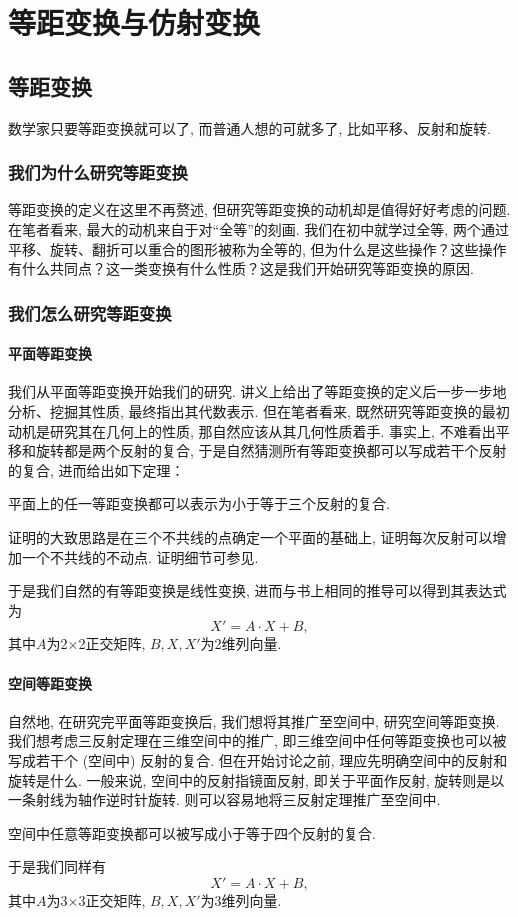 \documentclass[./main.tex]{subfiles}
\begin{document}
\chapter{等距变换与仿射变换}
\section{等距变换}\label{4.1}
数学家只要等距变换就可以了, 而普通人想的可就多了, 比如平移、反射和旋转. 
\subsection{我们为什么研究等距变换}
等距变换的定义在这里不再赘述, 但研究等距变换的动机却是值得好好考虑的问题. 在笔者看来, 最大的动机来自于对``全等''的刻画. 我们在初中就学过全等, 两个通过平移、旋转、翻折可以重合的图形被称为全等的, 但为什么是这些操作？这些操作有什么共同点？这一类变换有什么性质？这是我们开始研究等距变换的原因. 
\subsection{我们怎么研究等距变换}
\subsubsection{平面等距变换}
我们从平面等距变换开始我们的研究. 讲义上给出了等距变换的定义后一步一步地分析、挖掘其性质, 最终指出其代数表示. 但在笔者看来, 既然研究等距变换的最初动机是研究其在几何上的性质, 那自然应该从其几何性质着手. 事实上, 不难看出平移和旋转都是两个反射的复合, 于是自然猜测所有等距变换都可以写成若干个反射的复合, 进而给出如下定理：
\begin{theorem}[三反射定理]
    平面上的任一等距变换都可以表示为小于等于三个反射的复合. 
\end{theorem}
证明的大致思路是在三个不共线的点确定一个平面的基础上, 证明每次反射可以增加一个不共线的不动点. 证明细节可参见\cite{gos}.

于是我们自然的有等距变换是线性变换, 进而与书上相同的推导可以得到其表达式为
\[
X'=A\cdot X+B,
\]
其中$A$为2×2正交矩阵, $B,X,X'$为2维列向量. 
\subsubsection{空间等距变换}
自然地, 在研究完平面等距变换后, 我们想将其推广至空间中, 研究空间等距变换. 我们想考虑三反射定理在三维空间中的推广, 即三维空间中任何等距变换也可以被写成若干个 (空间中) 反射的复合. 但在开始讨论之前, 理应先明确空间中的反射和旋转是什么. 一般来说, 空间中的反射指镜面反射, 即关于平面作反射, 旋转则是以一条射线为轴作逆时针旋转. 则可以容易地将三反射定理推广至空间中. 
\begin{theorem}
    空间中任意等距变换都可以被写成小于等于四个反射的复合. 
\end{theorem}
于是我们同样有
\[
X'=A\cdot X+B,
\]
其中$A$为3×3正交矩阵, $B,X,X'$为3维列向量. 
\end{document}
